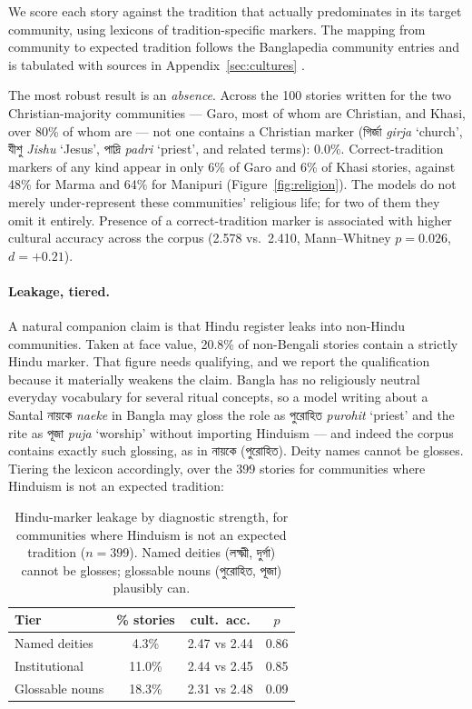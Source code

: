 \documentclass[11pt]{article}
\newcommand{\bn}[1]{{\bnfont #1}}
\begin{document}
We score each story against the tradition that actually predominates in its
target community, using lexicons of tradition-specific markers. The mapping
from community to expected tradition follows the Banglapedia community entries
and is tabulated with sources in Appendix~\ref{sec:cultures}
\cite{banglapedia}.

The most robust result is an \emph{absence}. Across the 100 stories written for
the two Christian-majority communities --- Garo, most of whom are Christian,
and Khasi, over 80\% of whom are \cite{banglapedia-garo,banglapedia-khasia}
--- not one contains a Christian marker (\bn{গির্জা} \textit{girja} `church', \bn{যীশু}
\textit{Jishu} `Jesus', \bn{পাদ্রি} \textit{padri} `priest', and related
terms): 0.0\%. Correct-tradition markers of any kind appear in only 6\% of Garo
and 6\% of Khasi stories, against 48\% for Marma and 64\% for Manipuri
(Figure~\ref{fig:religion}). The models do not merely under-represent these
communities' religious life; for two of them they omit it entirely. Presence of
a correct-tradition marker is associated with higher cultural accuracy across
the corpus (2.578 vs.\ 2.410, Mann--Whitney $p = 0.026$, $d = +0.21$).

\paragraph{Leakage, tiered.} A natural companion claim is that Hindu register
leaks into non-Hindu communities. Taken at face value, 20.8\% of non-Bengali
stories contain a strictly Hindu marker. That figure needs qualifying, and we
report the qualification because it materially weakens the claim. Bangla has no
religiously neutral everyday vocabulary for several ritual concepts, so a model
writing about a Santal \bn{নায়কে} \textit{naeke} in Bangla may gloss the role
as \bn{পুরোহিত} \textit{purohit} `priest' and the rite as \bn{পূজা}
\textit{puja} `worship' without importing Hinduism --- and indeed the corpus
contains exactly such glossing, as in \bn{নায়কে (পুরোহিত)}. Deity names cannot
be glosses. Tiering the lexicon accordingly, over the 399 stories for
communities where Hinduism is not an expected tradition:

\begin{table}[t]
\centering\small
\begin{tabular}{lccc}
\toprule
Tier & \% stories & cult.\ acc. & $p$ \\
\midrule
Named deities        & 4.3\%  & 2.47 vs 2.44 & 0.86 \\
Institutional        & 11.0\% & 2.44 vs 2.45 & 0.85 \\
Glossable nouns      & 18.3\% & 2.31 vs 2.48 & 0.09 \\
\bottomrule
\end{tabular}
\caption{Hindu-marker leakage by diagnostic strength, for communities where
Hinduism is not an expected tradition ($n = 399$). Named deities
(\bn{লক্ষ্মী}, \bn{দুর্গা}) cannot be glosses; glossable nouns
(\bn{পুরোহিত}, \bn{পূজা}) plausibly can.}
\label{tab:tiers}
\end{table}
\end{document}
